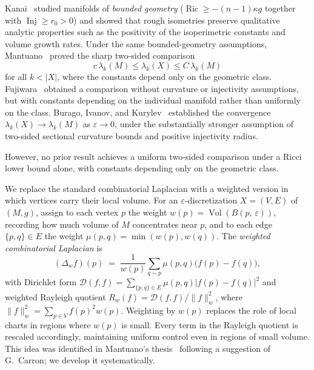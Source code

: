 \documentclass[10pt,reqno]{amsart}
\theoremstyle{remark}
\newcommand{\Ric}{\operatorname{Ric}}
\newcommand{\Inj}{\operatorname{Inj}}
\newcommand{\Vol}{\operatorname{Vol}}
\newcommand{\normw}[1]{\lVert #1 \rVert_{w}}
\newcommand{\DD}{\mathcal{D}}
\newcommand{\Rw}{R_{w}}
\newcommand{\B}[2]{B(#1,\,#2)}
\begin{document}
Kanai~\cite{Kanai1985,Kanai1986} studied manifolds of \emph{bounded
geometry} ($\Ric\geq-(n-1)\kappa g$ together with $\Inj\geq r_0>0$)
and showed that rough isometries preserve qualitative analytic
properties such as the positivity of the isoperimetric constants and volume growth rates. Under
the same bounded-geometry assumptions, Mantuano~\cite{Mantuano2005}
proved the sharp two-sided comparison
\[
  c\,\lambda_k(M)\leq\lambda_k(X)\leq C\,\lambda_k(M)
\]
for all $k<|X|$, where the constants depend only on the geometric
class. Fujiwara~\cite{Fujiwara1995} obtained a comparison without
curvature or injectivity assumptions, but with constants depending on
the individual manifold rather than uniformly on the class. Burago,
Ivanov, and Kurylev~\cite{BuragoIvanovKurylev2014} established the
convergence $\lambda_k(X)\to\lambda_k(M)$ as $\varepsilon\to 0$, under
the substantially stronger assumption of two-sided sectional curvature
bounds and positive injectivity radius.

However, no prior result achieves a uniform two-sided comparison under
a Ricci lower bound alone, with constants depending only on the
 geometric class. 

We replace the standard combinatorial Laplacian with a weighted
version in which vertices carry their local volume. For an
$\varepsilon$-discretization $X=(V,E)$ of $(M,g)$, assign to each
vertex $p$ the weight $w(p)=\Vol(\B{p}{\varepsilon})$, recording how
much volume of $M$ concentrates near $p$, and to each edge
$\{p,q\}\in E$ the weight $\mu(p,q)=\min(w(p),w(q))$. The
\emph{weighted combinatorial Laplacian} is
\[
  (\Delta_w f)(p)
  \;=\;
  \frac{1}{w(p)}\sum_{q\sim p}\mu(p,q)\bigl(f(p)-f(q)\bigr),
\]
with Dirichlet form $\DD(f,f)=\sum_{\{p,q\}\in E}\mu(p,q)|f(p)-f(q)|^2$
and weighted Rayleigh quotient $\Rw(f)=\DD(f,f)/\normw{f}^2$, where
$\normw{f}^2=\sum_{p\in V}f(p)^2w(p)$. Weighting by $w(p)$ replaces
the role of local charts in regions where $w(p)$ is
small. Every term in the Rayleigh quotient is rescaled accordingly,
maintaining uniform control even in regions of small volume. This idea
was identified in Mantuano's thesis~\cite{MantuanoThesis} following a
suggestion of G.~Carron; we develop it systematically.
\end{document}
